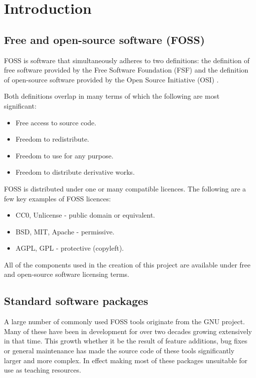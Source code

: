 \section{Introduction}\label{Introduction}

\subsection{Free and open-source software (FOSS)}

FOSS is software that simultaneously adheres to two definitions: the definition of free software provided by the Free Software Foundation (FSF) \cite{fsf} and the definition of open-source software provided by the Open Source Initiative (OSI) \cite{osi}.

Both definitions overlap in many terms of which the following are most significant:

\begin{itemize}
    \item Free access to source code.
    \item Freedom to redistribute.
    \item Freedom to use for any purpose.
    \item Freedom to distribute derivative works.
\end{itemize}

FOSS is distributed under one or many compatible licences. The following are a few key examples of FOSS licences:

\begin{itemize}
    \item CC0, Unlicense - public domain or equivalent.
    \item BSD, MIT, Apache - permissive.
    \item AGPL, GPL - protective (copyleft).
\end{itemize}

All of the components used in the creation of this project are available under free and open-source software licensing terms.

\subsection{Standard software packages}

A large number of commonly used FOSS tools originate from the GNU project. Many of these have been in development for over two decades growing extensively in that time. This growth whether it be the result of feature additions, bug fixes or general maintenance has made the source code of these tools significantly larger and more complex. In effect making most of these packages unsuitable for use as teaching resources.

